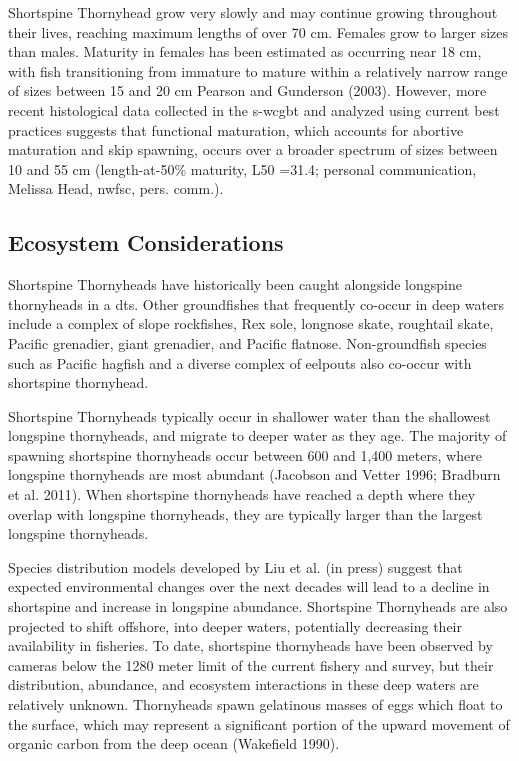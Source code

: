 \documentclass[11pt,
  english,
  letterpaper,
]{article}
\begin{document}
Shortspine Thornyhead grow very slowly and may continue growing throughout their lives, reaching maximum lengths of over 70 cm. Females grow to larger sizes than males. Maturity in females has been estimated as occurring near 18 cm, with fish transitioning from immature to mature within a relatively narrow range of sizes between 15 and 20 cm Pearson and Gunderson (2003). However, more recent histological data collected in the \gls{s-wcgbt} and analyzed using current best practices suggests that functional maturation, which accounts for abortive maturation and skip spawning, occurs over a broader spectrum of sizes between 10 and 55 cm (length-at-50\% maturity, L50 =31.4; personal communication, Melissa Head, \gls{nwfsc}, pers. comm.).

\hypertarget{ecosystem-considerations-1}{%
\subsection{Ecosystem Considerations}\label{ecosystem-considerations-1}}

Shortspine Thornyheads have historically been caught alongside longspine thornyheads in a \gls{dts}. Other groundfishes that frequently co-occur in deep waters include a complex of slope rockfishes, Rex sole, longnose skate, roughtail skate, Pacific grenadier, giant grenadier, and Pacific flatnose. Non-groundfish species such as Pacific hagfish and a diverse complex of eelpouts also co-occur with shortspine thornyhead.

Shortspine Thornyheads typically occur in shallower water than the shallowest longspine thornyheads, and migrate to deeper water as they age. The majority of spawning shortspine thornyheads occur between 600 and 1,400 meters, where longspine thornyheads are most abundant (Jacobson and Vetter 1996; Bradburn et al. 2011). When shortspine thornyheads have reached a depth where they overlap with longspine thornyheads, they are typically larger than the largest longspine thornyheads.

Species distribution models developed by Liu et al. (in press) suggest that expected environmental changes over the next decades will lead to a decline in shortspine and increase in longspine abundance. Shortspine Thornyheads are also projected to shift offshore, into deeper waters, potentially decreasing their availability in fisheries. To date, shortspine thornyheads have been observed by cameras below the 1280 meter limit of the current fishery and survey, but their distribution, abundance, and ecosystem interactions in these deep waters are relatively unknown. Thornyheads spawn gelatinous masses of eggs which float to the surface, which may represent a significant portion of the upward movement of organic carbon from the deep ocean (Wakefield 1990).
\end{document}
